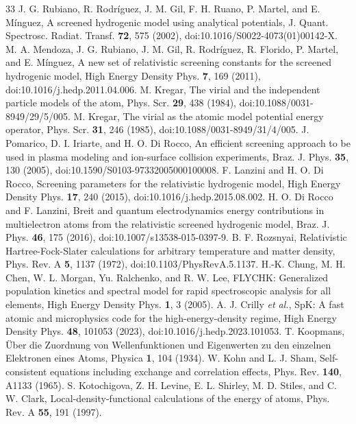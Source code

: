\documentclass[aps,pra,preprint,notitlepage,superscriptaddress,amsmath,amssymb]{revtex4-2}
\begin{document}
\begin{thebibliography}{33}
 J. G. Rubiano, R. Rodríguez, J. M. Gil, F. H. Ruano, P. Martel, and E. Mínguez, A screened hydrogenic model using analytical potentials, J. Quant. Spectrosc. Radiat. Transf. \textbf{72}, 575 (2002), doi:10.1016/S0022-4073(01)00142-X.
 M. A. Mendoza, J. G. Rubiano, J. M. Gil, R. Rodríguez, R. Florido, P. Martel, and E. Mínguez, A new set of relativistic screening constants for the screened hydrogenic model, High Energy Density Phys. \textbf{7}, 169 (2011), doi:10.1016/j.hedp.2011.04.006.
 M. Kregar, The virial and the independent particle models of the atom, Phys. Scr. \textbf{29}, 438 (1984), doi:10.1088/0031-8949/29/5/005.
 M. Kregar, The virial as the atomic model potential energy operator, Phys. Scr. \textbf{31}, 246 (1985), doi:10.1088/0031-8949/31/4/005.
 J. Pomarico, D. I. Iriarte, and H. O. Di Rocco, An efficient screening approach to be used in plasma modeling and ion-surface collision experiments, Braz. J. Phys. \textbf{35}, 130 (2005), doi:10.1590/S0103-97332005000100008.
 F. Lanzini and H. O. Di Rocco, Screening parameters for the relativistic hydrogenic model, High Energy Density Phys. \textbf{17}, 240 (2015), doi:10.1016/j.hedp.2015.08.002.
 H. O. Di Rocco and F. Lanzini, Breit and quantum electrodynamics energy contributions in multielectron atoms from the relativistic screened hydrogenic model, Braz. J. Phys. \textbf{46}, 175 (2016), doi:10.1007/s13538-015-0397-9.
 B. F. Rozsnyai, Relativistic Hartree-Fock-Slater calculations for arbitrary temperature and matter density, Phys. Rev. A \textbf{5}, 1137 (1972), doi:10.1103/PhysRevA.5.1137.
 H.-K. Chung, M. H. Chen, W. L. Morgan, Yu. Ralchenko, and R. W. Lee, FLYCHK: Generalized population kinetics and spectral model for rapid spectroscopic analysis for all elements, High Energy Density Phys. \textbf{1}, 3 (2005).
 A. J. Crilly \emph{et al.}, SpK: A fast atomic and microphysics code for the high-energy-density regime, High Energy Density Phys. \textbf{48}, 101053 (2023), doi:10.1016/j.hedp.2023.101053.
 T. Koopmans, Über die Zuordnung von Wellenfunktionen und Eigenwerten zu den einzelnen Elektronen eines Atoms, Physica \textbf{1}, 104 (1934).
 W. Kohn and L. J. Sham, Self-consistent equations including exchange and correlation effects, Phys. Rev. \textbf{140}, A1133 (1965).
 S. Kotochigova, Z. H. Levine, E. L. Shirley, M. D. Stiles, and C. W. Clark, Local-density-functional calculations of the energy of atoms, Phys. Rev. A \textbf{55}, 191 (1997).

\end{thebibliography}
\end{document}
